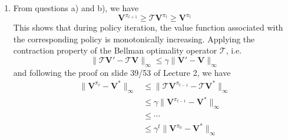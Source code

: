 \begin{Solution}
\begin{enumerate} [label=\alph*)]
$$        $$
        \item
        From questions a) and b), we have
        $$
        \mathbf{V}^{\pi_{t+1}} \geq \mathcal{T}\mathbf{V}^{\pi_t} \geq \mathbf{V}^{\pi_{t}}
        $$
        This shows that during policy iteration, the value function associated with the corresponding policy is monotonically increasing. Applying the contraction property of the Bellman optimality operator $\mathcal{T}$, i.e.
        $$
        \|\mathcal{T}\mathbf{V}' - \mathcal{T}\mathbf{V}\|_\infty \leq \gamma \|\mathbf{V}' - \mathbf{V} \|_\infty
        $$
        and following the proof on slide 39/53 of Lecture 2, we have
        $$
        \begin{aligned}
        \| \mathbf{V}^{\pi_{t}} - \mathbf{V}^*\|_\infty & \leq \|\mathcal{T}\mathbf{V}^{\pi_{t-1}} - \mathcal{T}\mathbf{V}^*\|_\infty \\
        & \leq \gamma \| \mathbf{V}^{\pi_{t-1}} - \mathbf{V}^*\|_\infty \\
        & \leq \cdots \\
        & \leq \gamma^t \| \mathbf{V}^{\pi_{0}} - \mathbf{V}^*\|_\infty \\
        \end{aligned}
        $$
    \end{enumerate}
\end{Solution}


\newpage
